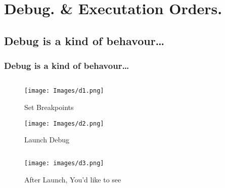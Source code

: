 \documentclass[
  11pt, %
  xcolor=dvipsnames
]{beamer}
\newcounter{image}
\begin{document}
\section{Debug. \& Executation Orders.}

\subsection{Debug is a kind of behavour\dots}

\begin{frame}
	\frametitle{Debug is a kind of behavour\dots}

	\begin{columns}
		\begin{column}{0.8\textwidth}

			\begin{figure}
				\begin{center}
					\texttt{[image: Images/d1.png]}
				\end{center}
				\caption{Set Breakpoints}\label{fig:9.1}
			\end{figure}

			\begin{figure}
				\begin{center}
					\texttt{[image: Images/d2.png]}
				\end{center}
				\caption{Launch Debug}\label{fig:9.2}
			\end{figure}

		\end{column}
	\end{columns}

\end{frame}

\begin{frame}

	\begin{columns}
		\begin{column}{0.8\textwidth}

			\begin{figure}
				\begin{center}
					\texttt{[image: images/d3.png]}
				\end{center}
				\caption{After Launch, You'd like to see}\label{fig:9.3}
			\end{figure}

		\end{column}
	\end{columns}
\end{frame}
\end{document}
